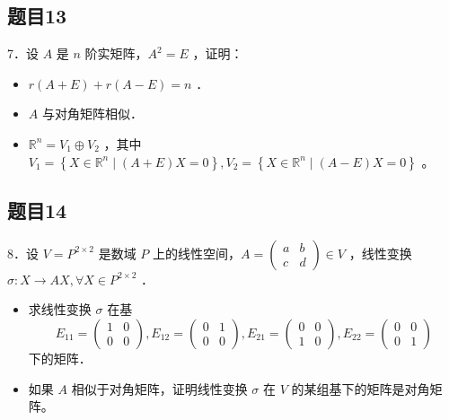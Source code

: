 \documentclass{article}
\begin{document}
\subsection{题目13}
7．设 \(A\) 是 \(n\) 阶实矩阵，\(A^{2}=E\) ，证明：

\begin{itemize}
  \item[（1）] \(r(A+E)+r(A-E)=n\) ．
  \item[（2）] \(A\) 与对角矩阵相似．
  \item[（3）] \(\mathbb{R}^{n}=V_{1} \oplus V_{2}\) ，其中 \(V_{1}=\left\{X \in \mathbb{R}^{n} \mid(A+E) X=0\right\}, V_{2}=\left\{X \in \mathbb{R}^{n} \mid(A-E) X=0\right\}\) 。
\end{itemize}

\subsection{题目14}
8．设 \(V=P^{2 \times 2}\) 是数域 \(P\) 上的线性空间，\(A=\left(\begin{array}{ll}a & b \\ c & d\end{array}\right) \in V\) ，线性变换 \(\sigma: X \rightarrow A X, \forall X \in P^{2 \times 2}\) ．

\begin{itemize}
  \item[（1）] 求线性变换 \(\sigma\) 在基
\[
E_{11}=\left(\begin{array}{ll}
1 & 0 \\
0 & 0
\end{array}\right), E_{12}=\left(\begin{array}{ll}
0 & 1 \\
0 & 0
\end{array}\right), E_{21}=\left(\begin{array}{ll}
0 & 0 \\
1 & 0
\end{array}\right), E_{22}=\left(\begin{array}{ll}
0 & 0 \\
0 & 1
\end{array}\right)
\]
下的矩阵．
  \item[（2）] 如果 \(A\) 相似于对角矩阵，证明线性变换 \(\sigma\) 在 \(V\) 的某组基下的矩阵是对角矩阵。
\end{itemize}
\end{document}
